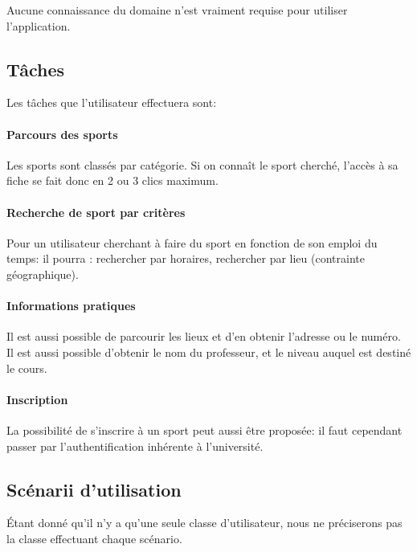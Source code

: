 \documentclass[french, titlepage, 11pt, a4paper]{article}
\begin{document}
		Aucune connaissance du domaine n'est vraiment requise pour utiliser
		l'application.

	\subsection{Tâches}

	 Les tâches que l'utilisateur effectuera sont:

	    \paragraph{Parcours des sports}

	        Les sports sont classés par catégorie. Si on connaît le sport
	        cherché, l'accès à sa fiche se fait donc en 2 ou 3 \og clics\fg{}
	        maximum.

        \paragraph{Recherche de sport par critères}

            Pour un utilisateur cherchant à faire du sport en fonction de son
            emploi du temps: il pourra : rechercher par horaires, rechercher par
            lieu (contrainte géographique).

        \paragraph{Informations pratiques}

            Il est aussi possible de parcourir les lieux et d'en obtenir
            l'adresse ou le numéro. Il est aussi possible d'obtenir le nom du
            professeur, et le niveau auquel est destiné le cours.

        \paragraph{Inscription}

            La possibilité de s'inscrire à un sport peut aussi être proposée: il
            faut cependant passer par l'authentification inhérente à
            l'université.


    \subsection{Scénarii d'utilisation}

    Étant donné qu'il n'y a qu'une seule classe d'utilisateur, nous ne
    préciserons pas la classe effectuant chaque scénario.
\end{document}
